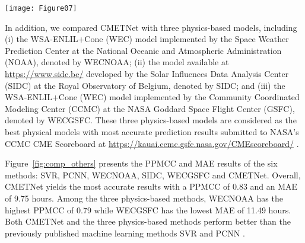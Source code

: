 \documentclass{article}
\begin{document}
\begin{figure*}[ht]
\begin{center}
\texttt{[image: Figure07]}
\end{center}
\caption{Performance comparison of six methods for CME arrival time prediction.
CMETNet is the ensemble learning framework proposed in this paper.
SVR and PCNN are previously published machine learning methods.
WECNOAA, SIDC, and WECGSFC are physics-based models presented on NASA's CCMC CME Scoreboard.
(a) Pearson product-moment correlation coefficients (PPMCCs) of the six methods.
(b) Mean absolute errors (MAEs) of the six methods.
CMETNet outperforms the other five methods in terms of both PPMCC and MAE.}
\label{fig:comp_others}
\end{figure*}

In addition, we compared CMETNet with 
three physics-based models, including 
(i) the WSA-ENLIL+Cone (WEC) model \citep{https://doi.org/10.1029/2003JA010135,2018SpWea..16.1245R} 
implemented by the Space Weather Prediction Center at
the National Oceanic and Atmospheric Administration (NOAA), 
denoted by WECNOAA;
(ii) the model available at 
\url{https://www.sidc.be/}
developed by the 
Solar Influences Data Analysis Center (SIDC) 
at the Royal Observatory of Belgium,
denoted by SIDC; and
(iii) the WSA-ENLIL+Cone (WEC) model 
implemented by the Community Coordinated Modeling Center (CCMC)
at the NASA Goddard Space Flight Center (GSFC),
denoted by WECGSFC.
These three physics-based models 
are considered as the best physical models 
with most accurate prediction results submitted to 
NASA's CCMC CME Scoreboard
at \url{https://kauai.ccmc.gsfc.nasa.gov/CMEscoreboard/}
\citep{2018SpWea..16.1245R}.

Figure~\ref{fig:comp_others} presents the PPMCC and MAE results
of the six methods:
SVR, PCNN, WECNOAA, SIDC, WECGSFC and CMETNet.
Overall, CMETNet yields the most accurate results with a PPMCC of 0.83 and an MAE of 9.75 hours. 
Among the three physics-based methods, 
WECNOAA has the highest PPMCC of 0.79 while WECGSFC has the lowest MAE of 11.49 hours. 
Both CMETNet and the three physics-based methods perform better than
the previously published machine learning methods SVR and PCNN 
\citep{2018ApJ...855..109L,2019ApJ...881...15W}.
\end{document}
